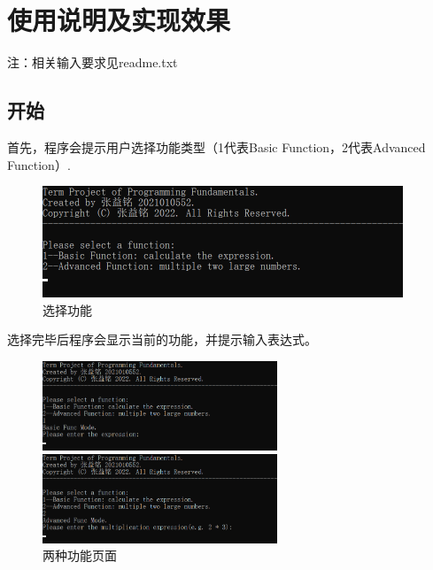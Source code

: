 \documentclass[a4paper, 11pt, UTF8]{ctexart}
\begin{document}
\section{使用说明及实现效果}

注：相关输入要求见readme.txt

\subsection{开始}

首先，程序会提示用户选择功能类型（1代表Basic Function，2代表Advanced Function）.

\begin{figure}[H]
    \centering
    \includegraphics[width=0.96\textwidth]{begin.png}
    \caption{选择功能}
\end{figure}

选择完毕后程序会显示当前的功能，并提示输入表达式。

\begin{figure}[H]
    \centering
    \begin{minipage}[t]{0.48\textwidth}
        \centering
        \includegraphics[width=7cm]{func1.png}
    \end{minipage}
    \begin{minipage}[t]{0.48\textwidth}
        \centering
        \includegraphics[width=7cm]{func2.png}
    \end{minipage}
    \caption{两种功能页面}
\end{figure}
\end{document}

